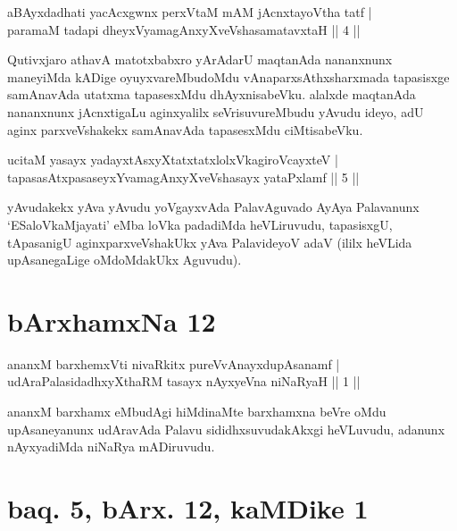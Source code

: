 \begin{shl}
aBAyxdadhati yacAcxgwnx perxVtaM mAM jAcnxtayoV\s tha tatf | \\
paramaM tadapi dheyxVyamagAnxyXveVshasamatavxtaH \hfill ||  4 || 
\end{shl}

\begin{artha}
Qutivxjaro athavA matotxbabxro yArAdarU maqtanAda nananxnunx maneyiMda kADige oyuyxvareMbudoMdu vAnaparxsAthxsharxmada tapasisxge samAnavAda utatxma tapasesxMdu dhAyxnisabeVku. alalxde maqtanAda nananxnunx jAcnxtigaLu aginxyalilx seVrisuvureMbudu yAvudu ideyo, adU aginx parxveVshakekx samAnavAda tapasesxMdu ciMtisabeVku.
\end{artha}

\begin{shl}
ucitaM yasayx yadayxtAsxyXtatxtatxlolxVkagiroVcayxteV | \\
tapasasAtxpasaseyxYvamagAnxyXveVshasayx yataPxlamf \hfill ||  5 || 
\end{shl}

\begin{artha}
yAvudakekx yAva yAvudu yoVgayxvAda PalavAguvado AyAya Palavanunx `ESaloVkaMjayati' eMba loVka padadiMda heVLiruvudu, tapasisxgU, tApasanigU aginxparxveVshakUkx yAva PalavideyoV adaV (ililx heVLida upAsanegaLige oMdoMdakUkx Aguvudu).
\end{artha}

\centerline{}

\section*{bArxhamxNa 12}


\begin{shl}
ananxM barxhemxVti nivaRkitx pureVvAnayxdupAsanamf | \\
udAraPalasidadhxyXthaRM tasayx nAyxyeVna niNaRyaH \hfill ||  1 || 
\end{shl}

\begin{artha}
ananxM barxhamx eMbudAgi hiMdinaMte barxhamxna beVre oMdu upAsaneyanunx udAravAda Palavu sididhxsuvudakAkxgi heVLuvudu, adanunx nAyxyadiMda niNaRya mADiruvudu.
\end{artha}

\section*{baq. 5, bArx. 12, kaMDike 1}

